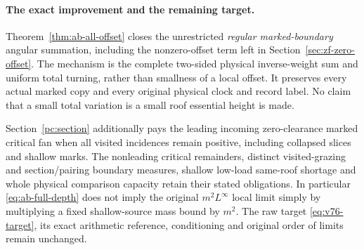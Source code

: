 \paragraph{The exact improvement and the remaining target.}
Theorem~\ref{thm:ab-all-offset} closes the unrestricted
\emph{regular marked-boundary} angular summation, including the
nonzero-offset term left in Section~\ref{sec:zf-zero-offset}.
The mechanism is the complete two-sided physical inverse-weight
sum and uniform total turning, rather than smallness of a local
offset.  It preserves every actual marked copy and every original
physical clock and record label.  No claim that a small total
variation is a small roof essential height is made.

Section~\ref{pc:section} additionally pays the leading incoming
zero-clearance marked critical fan when all visited incidences
remain positive, including collapsed slices and shallow marks.
The nonleading critical remainders, distinct visited-grazing and
section/pairing boundary measures, shallow low-load same-roof
shortage and whole physical comparison capacity retain their stated
obligations.  In particular \eqref{eq:ab-full-depth} does not imply
the original $m^2L^\infty$ local limit simply by multiplying a fixed
shallow-source mass bound by $m^2$.  The raw target
\eqref{eq:v76-target}, its exact arithmetic reference,
conditioning and original order of limits remain unchanged.
